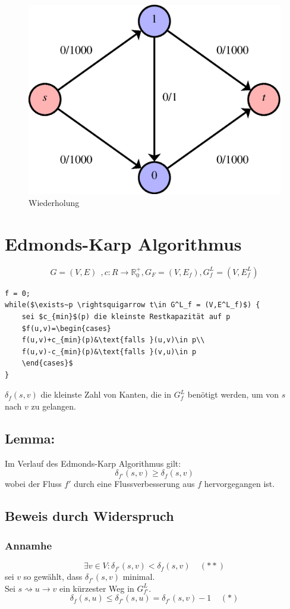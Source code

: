 \begin{figure}[h]
\centering
\includegraphics[width=0.4\linewidth]{26/Grafik/Diagramm1}
\caption{Wiederholung}
\label{fig:Diagramm1}
\end{figure}

\section{Edmonds-Karp Algorithmus}
\[ G=(V,E)~~,c:R\rightarrow\mathbb{R}^+_0,G_F=(V,E_f), G^L_f=(V,E^L_f) \]
\begin{lstlisting}
f = 0;
while($\exists~p \rightsquigarrow t\in G^L_f = (V,E^L_f)$) {
	sei $c_{min}$(p) die kleinste Restkapazität auf p
	$f(u,v)=\begin{cases}
	f(u,v)+c_{min}(p)&\text{falls }(u,v)\in p\\
	f(u,v)-c_{min}(p)&\text{falls }(v,u)\in p
	\end{cases}$
} 
\end{lstlisting}
$\delta_f(s,v)$ die kleinste Zahl von Kanten, die in $G^L_f$ benötigt werden, um von $s$ nach $v$ zu gelangen.
\subsection{Lemma:}
Im Verlauf des Edmonds-Karp Algorithmus gilt:
\[ \delta_{f'}(s,v) \geq \delta_f(s,v) \]
wobei der Fluss $f'$ durch eine Flussverbesserung aus $f$ hervorgegangen ist.
\subsection{Beweis durch Widerspruch}
\subsubsection{Annamhe}
\[ \exists v\in V:\delta_{f'}(s,v)<\delta_f(s,v) ~~~~~(**)\]
sei $v$ so gewählt, dass $\delta_{f'}(s,v)$ minimal.\\
Sei $s\rightsquigarrow u\rightarrow v$ ein kürzester Weg in $G^L_{f'}$.
\[ \delta_f(s,u)\leq\delta_{f'}(s,u) = \delta_{f'}(s,v)-1~~~~~(*) \]
